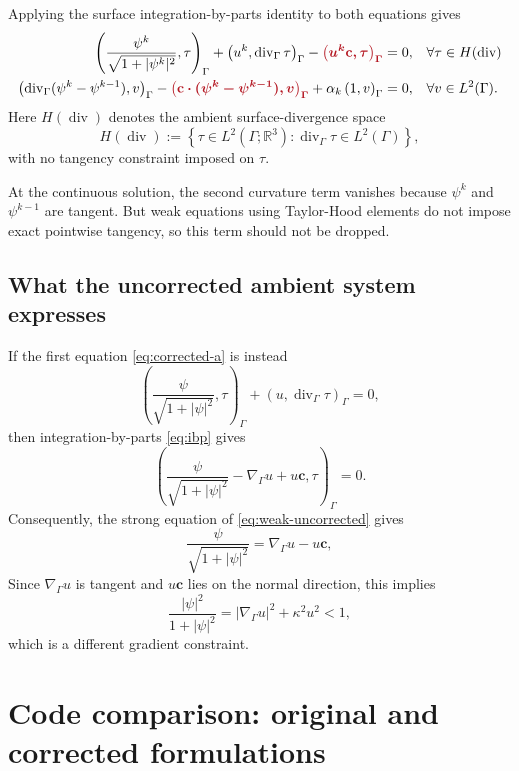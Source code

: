 \documentclass[11pt,a4paper]{article}
\newcommand{\curv}[1]{{\color{curvred}\bm{#1}}}
\newcommand{\G}{\Gamma}
\newcommand{\gradG}{\nabla_{\!\G}}
\newcommand{\divG}{\operatorname{div}_{\G}}
\newcommand{\cv}{\mathbf c}
\newcommand{\ip}[2]{\left(#1,#2\right)_{\G}}
\newcommand{\R}{\mathbb R}
\begin{document}
Applying the surface
integration-by-parts identity to both equations gives
\begin{subequations}\label{eq:corrected-mixed}
\begin{align}
 \ip{\frac{\psi^k}{\sqrt{1+|\psi^k|^2}}}{\tau}
 +\ip{u^k}{\divG\tau}
 -\curv{\ip{u^k\cv}{\tau}}
 &=0,&& \forall \tau \in H(\text{div}) \label{eq:corrected-a}\\
 \ip{\divG(\psi^k-\psi^{k-1})}{v}
 -\curv{\ip{\cv\cdot(\psi^k-\psi^{k-1})}{v}}
 +\alpha_k\ip{1}{v}
 &=0, && \forall v \in L^2(\Gamma).\label{eq:corrected-b}
\end{align}
\end{subequations}
Here $H(\operatorname{div})$ denotes the ambient surface-divergence space
\[
 H(\operatorname{div})
 :=\left\{\tau\in L^2(\G;\R^3):
          \divG\tau\in L^2(\G)\right\},
\]
with no tangency constraint imposed on $\tau$.

At the continuous solution, the second curvature term vanishes
because $\psi^k$ and $\psi^{k-1}$ are tangent.
But weak equations using Taylor-Hood elements do not impose exact pointwise
tangency, so this term should not be dropped.

\subsection{What the uncorrected ambient system expresses}

If the first equation \eqref{eq:corrected-a} is instead
\begin{equation}
 \ip{\frac{\psi}{\sqrt{1+|\psi|^2}}}{\tau}
 +\ip{u}{\divG\tau}=0,
\end{equation}
then integration-by-parts \eqref{eq:ibp} gives
\begin{equation}
 \ip{
   \frac{\psi}{\sqrt{1+|\psi|^2}}
   -\gradG u+u\cv
 }{\tau}=0.
 \label{eq:weak-uncorrected}
\end{equation}
Consequently, the strong equation of \eqref{eq:weak-uncorrected} gives 
\begin{equation}
 \frac{\psi}{\sqrt{1+|\psi|^2}}
   =\gradG u-u\cv,
 \label{eq:uncorrected}
\end{equation}
Since $\gradG u$ is tangent and $u\cv$ lies on the normal direction, this implies
\begin{equation}
 \frac{|\psi|^2}{1+|\psi|^2}
   =|\gradG u|^2+\kappa^2u^2<1,
\end{equation}
which is a different gradient constraint.

\section{Code comparison: original and corrected formulations}
\label{sec:code}
\end{document}
